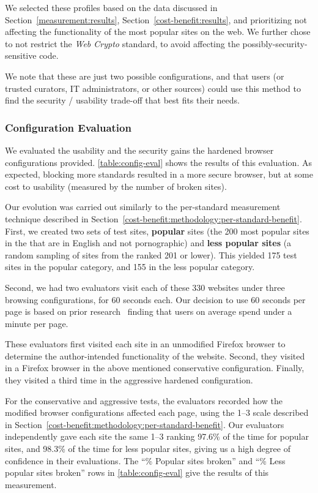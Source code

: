 We selected these profiles based on the data discussed in
Section~\ref{measurement:results}, Section~\ref{cost-benefit:results}, and
prioritizing not affecting the functionality of the most popular sites on the
web.  We further chose to not restrict the \emph{Web Crypto} standard, to avoid
affecting the possibly-security-sensitive code.

We note that these are just two possible configurations, and that users
(or trusted curators, IT administrators, or other sources) could
use this method to find the security / usability trade-off that best fits their
needs.


\subsubsection{Configuration Evaluation}
\label{current-web:extension:configuration-evaluations}

We evaluated the usability and the security gains the hardened browser
configurations provided.  \ref{table:config-eval} shows the results of this
evaluation.  As expected, blocking more standards resulted in a more secure
browser, but at some cost to usability (measured by the number of broken
sites).

Our evolution was carried out similarly to the per-standard measurement
technique described in
Section~\ref{cost-benefit:methodology:per-standard-benefit}.  First, we created
two sets of test sites, \textbf{popular} sites (the 200 most popular sites in
the \ATK that are in English and not pornographic) and \textbf{less popular
sites} (a random sampling of sites from the \ATK ranked 201 or lower).
This yielded 175 test sites in the popular category, and 155 in the less
popular category.

Second, we had two evaluators visit each of these 330 websites under three
browsing configurations, for 60 seconds each.  Our decision to use 60 seconds
per page is based on prior research~\cite{liu2010understanding} finding that
users on average spend under a minute per page.

These evaluators first visited each site in an unmodified
Firefox browser to determine the author-intended functionality of the website.
Second, they visited in a Firefox browser in the above mentioned conservative
configuration.  Finally, they visited a third time in the aggressive hardened
configuration.

For the conservative and aggressive tests, the evaluators recorded how the
modified browser configurations affected each page, using the 1--3 scale
described in Section~\ref{cost-benefit:methodology:per-standard-benefit}.  Our
evaluators independently gave each site the same 1--3 ranking 97.6\% of the
time for popular sites, and 98.3\% of the time for less popular sites, giving
us a high degree of confidence in their evaluations.  The ``\% Popular sites
broken'' and ``\% Less popular sites broken'' rows in \ref{table:config-eval}
give the results of this measurement.

